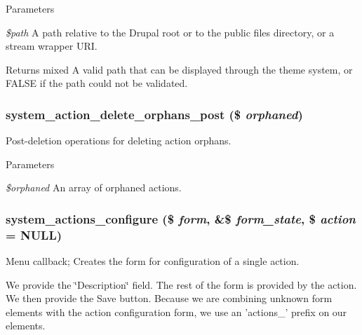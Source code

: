 \begin{DoxyParams}{Parameters}
\item[{\em \$path}]A path relative to the Drupal root or to the public files directory, or a stream wrapper URI. \end{DoxyParams}
\begin{DoxyReturn}{Returns}
mixed A valid path that can be displayed through the theme system, or FALSE if the path could not be validated. 
\end{DoxyReturn}
\hypertarget{system_8admin_8inc_acb4d8f440d314f1bc082acdbcb41fdd5}{
\subsubsection[{system\_\-action\_\-delete\_\-orphans\_\-post}]{\setlength{\rightskip}{0pt plus 5cm}system\_\-action\_\-delete\_\-orphans\_\-post (\$ {\em orphaned})}}
\label{system_8admin_8inc_acb4d8f440d314f1bc082acdbcb41fdd5}
Post-\/deletion operations for deleting action orphans.


\begin{DoxyParams}{Parameters}
\item[{\em \$orphaned}]An array of orphaned actions. \end{DoxyParams}
\hypertarget{system_8admin_8inc_aff0321246e1c42aab7d73b899065c45d}{
\subsubsection[{system\_\-actions\_\-configure}]{\setlength{\rightskip}{0pt plus 5cm}system\_\-actions\_\-configure (\$ {\em form}, \/  \&\$ {\em form\_\-state}, \/  \$ {\em action} = {\ttfamily NULL})}}
\label{system_8admin_8inc_aff0321246e1c42aab7d73b899065c45d}
Menu callback; Creates the form for configuration of a single action.

We provide the \char`\"{}Description\char`\"{} field. The rest of the form is provided by the action. We then provide the Save button. Because we are combining unknown form elements with the action configuration form, we use an 'actions\_\-' prefix on our elements.



